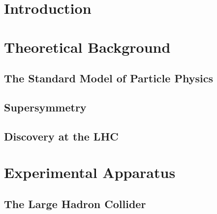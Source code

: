 \documentclass{outhesis}
\begin{document}
\chapter{Introduction}\label{chap:intro}
\graphicspath{{figures/intro/}}


\chapter{Theoretical Background}\label{chap:theory}
\graphicspath{{figures/theory/}}

\section{The Standard Model of Particle Physics}\label{sec:theory.sm}

\section{Supersymmetry}\label{sec:theory.susy}

%
\section{Discovery at the LHC}\label{sec:theory.disc}


\chapter{Experimental Apparatus}\label{chap:exp}
\graphicspath{{figures/exp/}}
\section{The Large Hadron Collider}\label{sec:exp.lhc}

\end{document}
